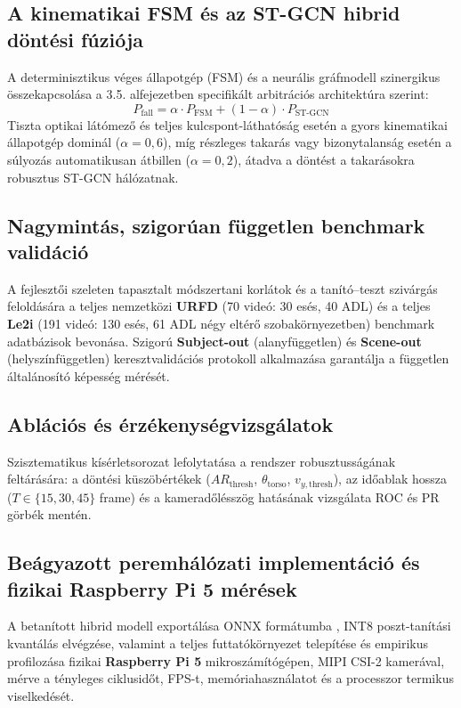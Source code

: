 \documentclass[12pt,a4paper,oneside]{report}
\begin{document}
\subsection{A kinematikai FSM és az ST-GCN hibrid döntési fúziója}
A determinisztikus véges állapotgép (FSM) és a neurális gráfmodell szinergikus összekapcsolása a 3.5. alfejezetben specifikált arbitrációs architektúra szerint:
\begin{equation}
P_{\text{fall}} = \alpha \cdot P_{\text{FSM}} + (1 - \alpha) \cdot P_{\text{ST-GCN}}
\end{equation}
Tiszta optikai látómező és teljes kulcspont-láthatóság esetén a gyors kinematikai állapotgép dominál ($\alpha = 0{,}6$), míg részleges takarás vagy bizonytalanság esetén a súlyozás automatikusan átbillen ($\alpha = 0{,}2$), átadva a döntést a takarásokra robusztus ST-GCN hálózatnak.

\subsection{Nagymintás, szigorúan független benchmark validáció}
A fejlesztői szeleten tapasztalt módszertani korlátok és a tanító--teszt szivárgás feloldására a teljes nemzetközi \textbf{URFD} (70 videó: 30 esés, 40 ADL) \cite{urfd2014} és a teljes \textbf{Le2i} (191 videó: 130 esés, 61 ADL négy eltérő szobakörnyezetben) \cite{le2i2013} benchmark adatbázisok bevonása. Szigorú \textbf{Subject-out} (alanyfüggetlen) és \textbf{Scene-out} (helyszínfüggetlen) keresztvalidációs protokoll alkalmazása garantálja a független általánosító képesség mérését.

\subsection{Ablációs és érzékenységvizsgálatok}
Szisztematikus kísérletsorozat lefolytatása a rendszer robusztusságának feltárására: a döntési küszöbértékek ($AR_{\text{thresh}}$, $\theta_{\text{torso}}$, $v_{y,\text{thresh}}$), az időablak hossza ($T \in \{15, 30, 45\}$ frame) és a kameradőlésszög hatásának vizsgálata ROC és PR görbék mentén.

\subsection{Beágyazott peremhálózati implementáció és fizikai Raspberry Pi 5 mérések}
A betanított hibrid modell exportálása ONNX formátumba \cite{onnxruntime2023}, INT8 poszt-tanítási kvantálás elvégzése, valamint a teljes futtatókörnyezet telepítése és empirikus profilozása fizikai \textbf{Raspberry Pi 5} mikroszámítógépen, MIPI CSI-2 kamerával, mérve a tényleges ciklusidőt, FPS-t, memóriahasználatot és a processzor termikus viselkedését.
\end{document}
